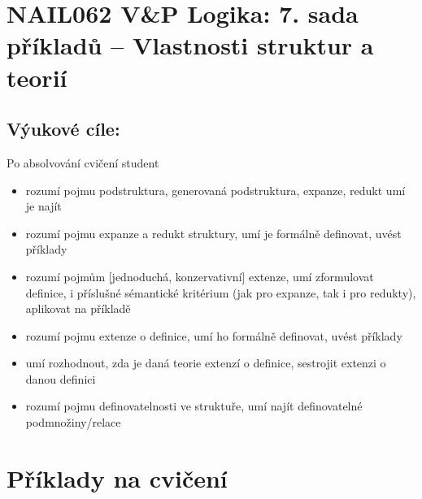 \section*{NAIL062 V\&P Logika: 7. sada příkladů -- Vlastnosti struktur a teorií}


\subsection*{Výukové cíle:} Po absolvování cvičení student

    \begin{itemize}\setlength{\itemsep}{0pt}
        \item rozumí pojmu podstruktura, generovaná podstruktura, expanze, redukt umí je najít
        \item rozumí pojmu expanze a redukt struktury, umí je formálně definovat, uvést příklady
        \item rozumí pojmům [jednoduchá, konzervativní] extenze, umí zformulovat definice, i příslušné sémantické kritérium (jak pro expanze, tak i pro redukty), aplikovat na příkladě
        \item rozumí pojmu extenze o definice, umí ho formálně definovat, uvést příklady
        \item umí rozhodnout, zda je daná teorie extenzí o definice, sestrojit extenzi o danou definici
        \item rozumí pojmu definovatelnosti ve struktuře, umí najít definovatelné podmnožiny/relace
    \end{itemize}
    

\section*{Příklady na cvičení}


